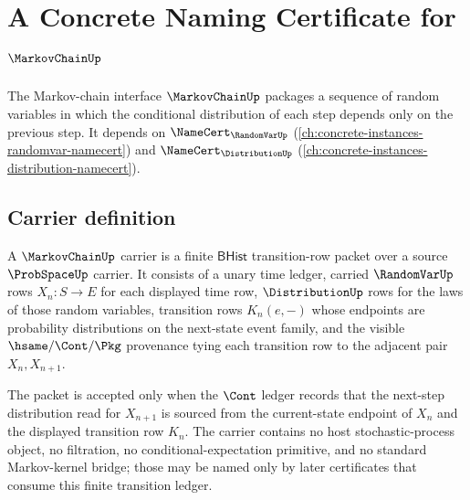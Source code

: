 \chapter{A Concrete Naming Certificate for $\MarkovChainUp$}
\label{ch:concrete-instances-markovchain-namecert}

The Markov-chain interface $\MarkovChainUp$ packages a sequence of random variables in which the conditional distribution of each step depends only on the previous step. It depends on $\NameCert_{\RandomVarUp}$ (\autoref{ch:concrete-instances-randomvar-namecert}) and $\NameCert_{\DistributionUp}$ (\autoref{ch:concrete-instances-distribution-namecert}).

\section{Carrier definition}
\label{sec:markovchain-carrier}

\begin{definition}
\label{def:markovchain-bhist-transition-carrier}
A $\MarkovChainUp$ carrier is a finite $\mathsf{BHist}$ transition-row packet over a source $\ProbSpaceUp$ carrier. It consists of a unary time ledger, carried $\RandomVarUp$ rows $X_n:S\to E$ for each displayed time row, $\DistributionUp$ rows for the laws of those random variables, transition rows $K_n(e,-)$ whose endpoints are probability distributions on the next-state event family, and the visible $\hsame/\Cont/\Pkg$ provenance tying each transition row to the adjacent pair $X_n,X_{n+1}$.

The packet is accepted only when the $\Cont$ ledger records that the next-step distribution read for $X_{n+1}$ is sourced from the current-state endpoint of $X_n$ and the displayed transition row $K_n$. The carrier contains no host stochastic-process object, no filtration, no conditional-expectation primitive, and no standard Markov-kernel bridge; those may be named only by later certificates that consume this finite transition ledger.
\end{definition}


